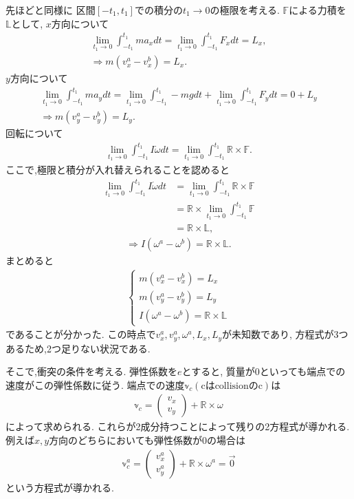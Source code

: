 \documentclass[a4paper,11pt]{jsarticle}
\begin{document}
先ほどと同様に
区間$[-t_1, t_1]$での積分の$t_1\rightarrow 0$の極限を考える.
$\mathbb{F}$による力積を$\mathbb{L}$として,
$x$方向について
\begin{gather*}
  \lim_{t_1 \rightarrow 0}\int_{-t_1}^{t_1} m a_x dt = \lim_{t_1 \rightarrow 0}\int_{-t_1}^{t_1} F_x dt = L_x,
  \\
  \Rightarrow
  m (v_x^a - v_x^b) = L_x.
\end{gather*}
$y$方向について
\begin{gather*}
  \lim_{t_1 \rightarrow 0}\int_{-t_1}^{t_1} m a_y dt
  = \lim_{t_1 \rightarrow 0}\int_{-t_1}^{t_1} -mg dt 
  + \lim_{t_1 \rightarrow 0}\int_{-t_1}^{t_1} F_y dt = 0 + L_y
  \\
  \Rightarrow
  m (v_y^a - v_y^b) = L_y.
\end{gather*}
回転について
\begin{align*}
  \lim_{t_1 \rightarrow 0} \int_{-t_1}^{t_1} I\dot\omega dt
  = \lim_{t_1 \rightarrow 0} \int_{-t_1}^{t_1} \mathbb{R} \times \mathbb{F}.
\end{align*}
ここで,極限と積分が入れ替えられることを認めると
\begin{align*}
  \lim_{t_1 \rightarrow 0} \int_{-t_1}^{t_1} I\dot\omega dt
  &= \lim_{t_1 \rightarrow 0} \int_{-t_1}^{t_1} \mathbb{R} \times \mathbb{F}
  \\ &= \mathbb{R} \times \lim_{t_1 \rightarrow 0} \int_{-t_1}^{t_1} \mathbb{F}
  \\ &= \mathbb{R} \times \mathbb{L},
\end{align*}
\begin{gather*}
  \Rightarrow
  I (\omega^a - \omega^b) = \mathbb{R} \times \mathbb{L}.
\end{gather*}
まとめると
\begin{gather*}
  \begin{cases}
    m (v_x^a - v_x^b) = L_x
    \\
    m (v_y^a - v_y^b) = L_y
    \\
    I (\omega^a - \omega^b) = \mathbb{R} \times \mathbb{L}
  \end{cases}
\end{gather*}
であることが分かった.
この時点で$v_x^a, v_y^a, \omega^a, L_x, L_y$が未知数であり,
方程式が3つあるため,2つ足りない状況である.

そこで,衝突の条件を考える.
弾性係数を$e$とすると,
質量が0といっても端点での速度がこの弾性係数に従う.
端点での速度$\mathbb{v}_c (\text{cはcollisionのc})$は
\begin{gather}
  \mathbb{v}_c = \begin{pmatrix}
    v_x
    \\
    v_y
  \end{pmatrix} + \mathbb{R} \times \omega
\end{gather}
によって求められる.
これらが2成分持つことによって残りの2方程式が導かれる.
例えば$x,y$方向のどちらにおいても弾性係数が0の場合は
\begin{gather*}
  \mathbb{v}_c^a = \begin{pmatrix}
    v_x^a
    \\
    v_y^a
  \end{pmatrix} + \mathbb{R} \times \omega^a = \vec{0}
\end{gather*}
という方程式が導かれる.
\end{document}
